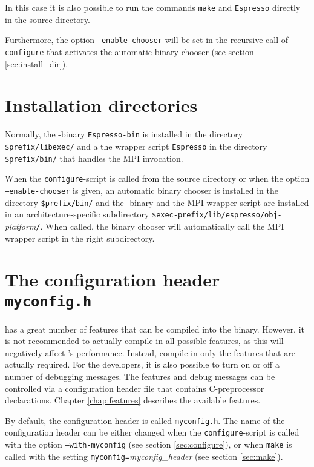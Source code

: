 In this case it is also possible to run the commands \texttt{make} and
\texttt{Espresso} directly in the source directory.

Furthermore, the option \texttt{--enable-chooser} will be set in the
recursive call of \texttt{configure} that activates the automatic
binary chooser (see section \vref{sec:install_dir}).

\section{Installation directories}
\label{sec:install_dir}

Normally, the \es-binary \texttt{Espresso-bin} is installed in the
directory \texttt{\$prefix/libexec/} and a the wrapper script
\texttt{Espresso} in the directory \texttt{\$prefix/bin/} that handles
the MPI invocation.

When the \texttt{configure}-script is called from the source directory
or when the option \texttt{--enable-chooser} is given, an automatic
binary chooser is installed in the directory \texttt{\$prefix/bin/}
and the \es{}-binary and the MPI wrapper script are installed in an
architecture-specific subdirectory
\mbox{\texttt{\$exec-prefix/lib/espresso/obj-}\textit{platform}\texttt{/}}.
When called, the binary chooser will automatically call the MPI
wrapper script in the right subdirectory.

\section{The configuration header \texttt{myconfig.h}}
\label{sec:myconfig}

  \es{} has a great
number of features that can be compiled into the binary. However, it
is not recommended to actually compile in all possible features, as
this will negatively affect \es's performance. Instead, compile in
only the features that are actually required. For the developers, it
is also possible to turn on or off a number of debugging messages. The
features and debug messages can be controlled via a configuration
header file that contains C-preprocessor declarations. Chapter
\vref{chap:features} describes the available features.

By default, the configuration header is called \texttt{myconfig.h}.
The name of the configuration header can be either changed when the
\texttt{configure}-script is called with the option
\texttt{--with-myconfig} (see section \vref{sec:configure}), or when
\texttt{make} is called with the setting
\texttt{myconfig=}\textit{myconfig\_header} (see section
\vref{sec:make}).

